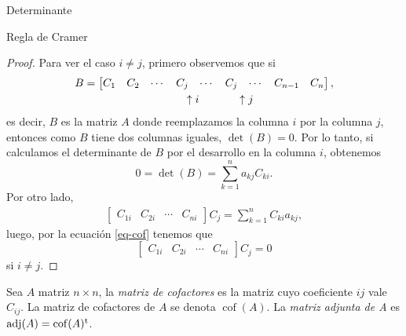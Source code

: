 \begin{chapter}{Determinante}
\begin{section}{Regla de Cramer}
\begin{proof}
                     Para ver el caso $i \ne j$, primero observemos que si 
                     \begin{align*}
                     B &= \begin{bmatrix} C_1 & C_2&\cdots &C_j& \cdots &C_j & \cdots &C_{n-1}& C_{n}\end{bmatrix}, \\
                     &\hspace{3.2cm} \uparrow i \hspace{1.2cm} \uparrow j
                     \end{align*}
                     es decir, $B$ es la matriz $A$ donde reemplazamos la columna $i$ por la columna $j$, entonces como $B$ tiene dos columnas iguales, $\det(B) =0$. Por lo tanto, si calculamos el determinante de $B$ por el desarrollo en la columna $i$, obtenemos
                     \begin{equation} \label{eq-cof}
                     0 = \det(B) = \sum_{k=1}^{n} a_{kj}C_{ki}.
                     \end{equation}
                     Por otro lado, 
                     \begin{align*}
                     \begin{bmatrix} C_{1i} & C_{2i} & \cdots & C_{ni}\end{bmatrix} C_j = \sum_{k=1}^{n} C_{ki}a_{kj},
                     \end{align*}
                     luego, por la ecuación \eqref{eq-cof} tenemos que 
                     $$
                     \begin{bmatrix} C_{1i} & C_{2i} & \cdots & C_{ni}\end{bmatrix} C_j =0
                     $$
                     si $i \ne j$.
                     
                 \end{proof}
                 
                 \begin{definicion} Sea $A$ matriz $n \times n$, la \textit{matriz de cofactores} es la matriz cuyo coeficiente $ij$ vale $C_{ij}$. La matriz de cofactores de $A$  se denota $\operatorname{cof}(A)$. La \textit{matriz adjunta de A} es $\operatorname{adj}(A) = \operatorname{cof}(A)^{\operatorname{t}}$.
                 \end{definicion}
                 

\end{section}
\end{chapter}

